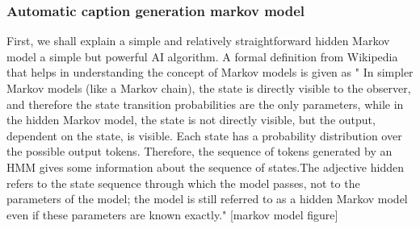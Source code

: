 \documentclass[sigconf]{acmart}
\begin{document}
\subsubsection{Automatic caption generation markov model}

First, we shall explain a simple and relatively straightforward hidden Markov model a simple but powerful AI algorithm. A formal definition from Wikipedia that helps in understanding the concept of Markov models is given as " In simpler Markov models (like a Markov chain), the state is directly visible to the observer, and therefore the state transition probabilities are the only parameters, while in the hidden Markov model, the state is not directly visible, but the output, dependent on the state, is visible. Each state has a probability distribution over the possible output tokens. Therefore, the sequence of tokens generated by an HMM gives some information about the sequence of states.The adjective hidden refers to the state sequence through which the model passes, not to the parameters of the model; the model is still referred to as a hidden Markov model even if these parameters are known exactly." \cite{Wikipedia2017a} [markov model figure]
\newline
\end{document}

